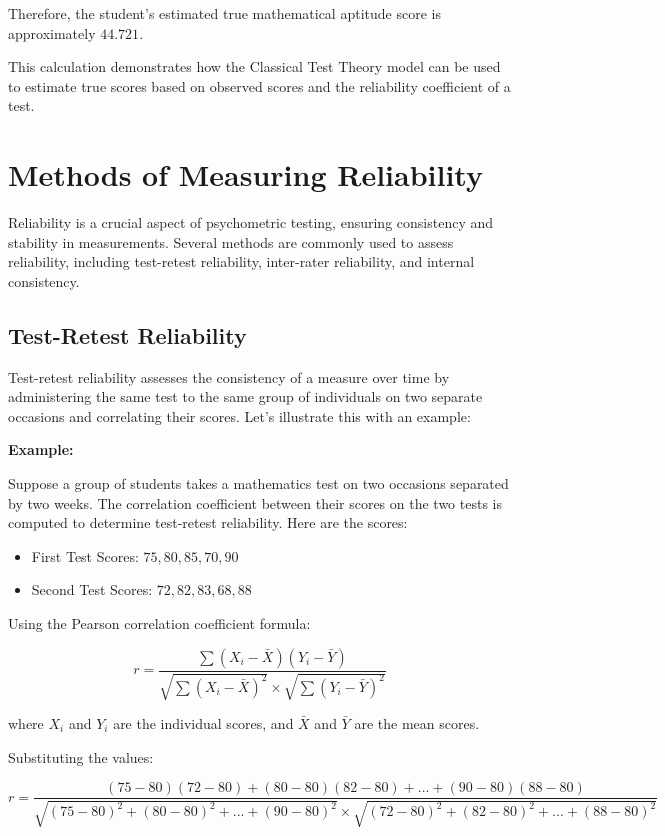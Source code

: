\documentclass[12pt, a4paper]{exam}
\begin{document}
Therefore, the student's estimated true mathematical aptitude score is approximately \(44.721\).

This calculation demonstrates how the Classical Test Theory model can be used to estimate true scores based on observed scores and the reliability coefficient of a test.

\section{Methods of Measuring Reliability}

Reliability is a crucial aspect of psychometric testing, ensuring consistency and stability in measurements. Several methods are commonly used to assess reliability, including test-retest reliability, inter-rater reliability, and internal consistency.

\subsection{Test-Retest Reliability}

Test-retest reliability assesses the consistency of a measure over time by administering the same test to the same group of individuals on two separate occasions and correlating their scores. Let's illustrate this with an example:

\textbf{Example:}

Suppose a group of students takes a mathematics test on two occasions separated by two weeks. The correlation coefficient between their scores on the two tests is computed to determine test-retest reliability. Here are the scores:

\begin{itemize}
    \item First Test Scores: \( 75, 80, 85, 70, 90 \)
    \item Second Test Scores: \( 72, 82, 83, 68, 88 \)
\end{itemize}

Using the Pearson correlation coefficient formula:

\[
r = \frac{\sum (X_i - \bar{X})(Y_i - \bar{Y})}{\sqrt{\sum (X_i - \bar{X})^2} \times \sqrt{\sum (Y_i - \bar{Y})^2}}
\]

where \(X_i\) and \(Y_i\) are the individual scores, and \(\bar{X}\) and \(\bar{Y}\) are the mean scores.

Substituting the values:

\[
r = \frac{(75-80)(72-80) + (80-80)(82-80) + ...+ (90-80)(88-80)}{\sqrt{(75-80)^2 + (80-80)^2 + ...+ (90-80)^2} \times \sqrt{(72-80)^2 + (82-80)^2 + ... + (88-80)^2}}
\]
\end{document}

